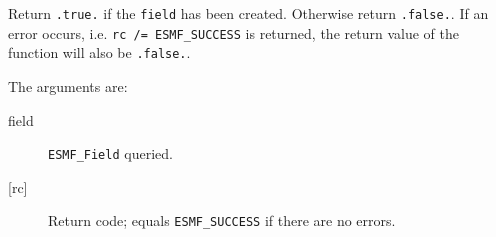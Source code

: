      Return {\tt .true.} if the {\tt field} has been created. Otherwise return 
     {\tt .false.}. If an error occurs, i.e. {\tt rc /= ESMF\_SUCCESS} is 
     returned, the return value of the function will also be {\tt .false.}.
  
   The arguments are:
     \begin{description}
     \item[field]
       {\tt ESMF\_Field} queried.
     \item[{[rc]}]
       Return code; equals {\tt ESMF\_SUCCESS} if there are no errors.
     \end{description}
  
\setlength{\parskip}{\oldparskip}
\setlength{\parindent}{\oldparindent}
\setlength{\baselineskip}{\oldbaselineskip}
